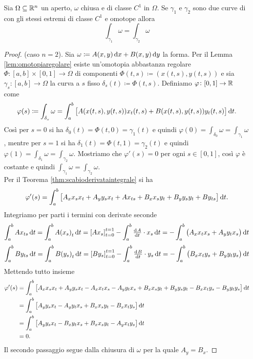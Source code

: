 \begin{thm} \label{thm:chiusacurveomotope}
	Sia $ \Omega \subseteq \mathbb{R}^n $ un aperto, $ \omega $ chiusa e di classe $ C^1 $ in $ \Omega $. Se $ \gamma_1 $ e $ \gamma_2 $ sono due curve di con gli stessi estremi di classe $ C^1 $ e omotope allora
	\begin{equation*}
		\int_{\gamma_1} \omega = \int_{\gamma_2} \omega
	\end{equation*}
\end{thm}
%
\begin{proof}
	(caso $ n = 2 $).
	Sia $ \omega \coloneqq A(x, y) \dif{x} + B(x, y) \dif{y} $ la forma. Per il Lemma \ref{lem:omotopiaregolare} esiste un'omotopia abbastanza regolare $ \Phi \colon [a, b] \times[0, 1] \to \Omega $ di componenti $ \Phi(t, s) \coloneqq (x(t, s), y(t, s)) $ e sia $ \gamma_s \colon [a, b] \to \Omega $ la curva a $ s $ fisso $ \delta_s(t) \coloneqq \Phi(t, s) $. Definiamo $ \varphi \colon [0, 1] \to \mathbb{R} $ come
	\[
		\varphi(s) \coloneqq \int_{\delta_s} \omega = \int_{a}^{b} \left[A(x(t, s), y(t, s)) x_t(t, s) + B(x(t, s), y(t, s)) y_t(t, s)\right] \dif{t}.
	\]
	Così per $ s = 0 $ si ha $ \delta_0(t) = \Phi(t, 0) = \gamma_1(t) $ e quindi $ \varphi(0) = \int_{\delta_0} \omega = \int_{\gamma_1} \omega $, mentre per $ s = 1 $ si ha $ \delta_1(t) = \Phi(t, 1) = \gamma_2(t) $ e quindi $ \varphi(1) = \int_{\delta_1} \omega = \int_{\gamma_2} \omega $. Mostriamo che $ \varphi'(s) = 0 $ per ogni $ s \in [0, 1] $, così $ \varphi $ è costante e quindi $ \int_{\gamma_1} \omega = \int_{\gamma_2} \omega $. \\
	Per il Teorema \ref{thm:scabioderivataintegrale} si ha
	\[
		\varphi'(s) = \int_{a}^{b} \left[A_x x_s x_t + A_y y_s x_t +  A x_{ts} + B_x x_s y_t + B_y y_s y_t + B y_{ts} \right] \dif{t}.
	\]
	Integriamo per parti i termini con derivate seconde
	\[
		\int_{a}^{b} A x_{ts} \dif{t} = \int_{a}^{b} A {(x_s)}_t \dif{t} = \left[A x_s\right]_{t = 0}^{t = 1} - \int_{a}^{b} \od{A}{t} \cdot x_s \dif{t} = - \int_{a}^{b} \left(A_x x_t x_s + A_y y_t x_s\right) \dif{t}
	\]
	\[
		\int_{a}^{b} B y_{ts} \dif{t} = \int_{a}^{b} B {(y_s)}_t \dif{t} = \left[B y_s\right]_{t = 0}^{t = 1} - \int_{a}^{b} \od{B}{t} \cdot y_s \dif{t} = - \int_{a}^{b} \left(B_x x_t y_s + B_y y_t y_s\right) \dif{t}
	\]
	Mettendo tutto insieme
	\begin{align*}
		\varphi'(s) & = \int_{a}^{b} \left[A_x x_s x_t + A_y y_s x_t - A_x x_t x_s - A_y y_t x_s + B_x x_s y_t + B_y y_s y_t - B_x x_t y_s - B_y y_t y_s \right] \dif{t} \\
		& = \int_{a}^{b} \left[A_y y_s x_t - A_y y_t x_s + B_x x_s y_t - B_x x_t y_s \right] \dif{t} \\
		& = \int_{a}^{b} \left[A_y y_s x_t - B_x y_t x_s + B_x x_s y_t - A_y x_t y_s \right] \dif{t} \\
		& = 0.
	\end{align*}
	Il secondo passaggio segue dalla chiusura di $ \omega $ per la quale $ A_y = B_x $.
\end{proof}
